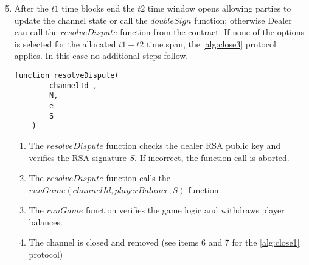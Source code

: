 \begin{algorithm}
\begin{enumerate}
	\setcounter{enumi}{4}
	\item After the $t1$ time blocks end the $t2$ time window opens allowing parties to update the channel state or call the  $doubleSign$ function; otherwise Dealer can call the $resolveDispute$ function from the contract. If none of the options is selected for the allocated $t1+t2$ time span, the \autoref{alg:close3} protocol applies. In this case no additional steps follow. \label{block}
\begin{lstlisting}
function resolveDispute(
        channelId ,
        N,
        e
        S
    )
\end{lstlisting}
\begin{enumerate}
	\item  The $resolveDispute$ function checks the dealer RSA public key and verifies the RSA signature $S$. If incorrect, the function call is aborted.
	\item The $resolveDispute$ function calls the $runGame(channelId , playerBalance, S)$ function.
	 \item The $runGame$ function verifies the game logic and withdraws player balances.
	\item  The channel is closed and removed (see items 6 and 7 for the \autoref{alg:close1} protocol)
\end{enumerate}
\end{enumerate}
\end{algorithm}

